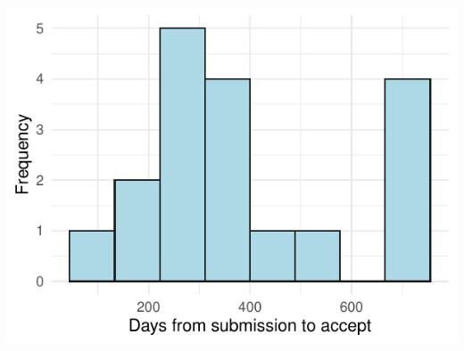 \begin{center}\includegraphics[width=0.5\linewidth]{figs/days-1} \end{center}


\address{%
Catherine Hurley\\
Maynooth University\\%
\\
%
\url{https://journal.r-project.org}\\%
%
\href{mailto:r-journal@r-project.org}{\nolinkurl{r-journal@r-project.org}}%
}
